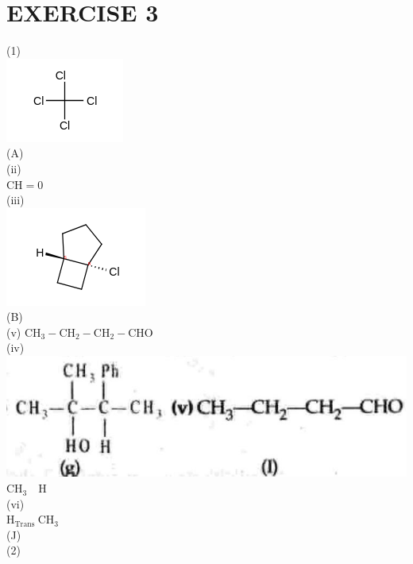 \documentclass[10pt]{article}
\begin{document}
\section*{EXERCISE 3}
(1)\\
\includegraphics{smile-3b56da55daf0707ae53d9bf1498080203d61e327}\\
(A)\\
(ii)\\
$\mathrm{CH}=0$\\
(iii)\\
\includegraphics{smile-063abac4c82431a9d83e45281b557535adee4c5f}\\
(B)\\
(v) $\mathrm{CH}_{3}-\mathrm{CH}_{2}-\mathrm{CH}_{2}-\mathrm{CHO}$\\
(iv)\\
\includegraphics[max width=\textwidth, center]{2025_01_28_8470952b98110cec3aabg-247(5)}\\
$\mathrm{CH}_{3} \quad \mathrm{H}$\\
(vi)\\
$\mathrm{H}_{\text {Trans }} \mathrm{CH}_{3}$\\
(J)\\
(2)\\
\end{document}
